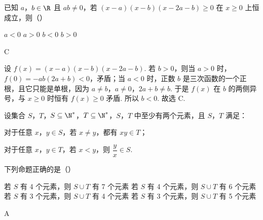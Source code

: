 \begin{problem}
已知 \(a\)，\(b\in\R\) 且 \(ab\neq0\)，若 \((x-a)(x-b)(x-2a-b)\ge0\) 在 \(x\ge0\) 上恒成立，则（\quad）

\choices
    {\(a<0\)}
    {\(a>0\)}
    {\(b<0\)}
    {\(b>0\)}
\end{problem}

\begin{answer}
C
\end{answer}

\begin{solution}
设 \(f(x)=(x-a)(x-b)(x-2a-b)\).
若 \(b>0\)，则当 \(a>0\) 时，\(f(0)=-ab(2a+b)<0\)，矛盾；当 \(a<0\) 时，正数 \(b\) 是三次函数的一个正根，且它只能是单根，因为 \(a\ne b\)，\(a\ne0\)，\(2a+b\ne b\). 于是 \(f(x)\) 在 \(b\) 的两侧异号，与 \(x\ge0\) 时恒有 \(f(x)\ge0\) 矛盾.
所以 \(b<0\). 故选 C.
\end{solution}

\begin{problem}
设集合 \(S\)，\(T\)，\(S\subseteq\N^*\)，\(T\subseteq\N^*\)，\(S\)，\(T\) 中至少有两个元素，且 \(S\)，\(T\) 满足：

\begin{circlelist}
\item 对于任意 \(x\)，\(y\in S\)，若 \(x\ne y\)，都有 \(xy\in T\)；

\item 对于任意 \(x\)，\(y\in T\)，若 \(x<y\)，则 \(\dfrac{y}{x}\in S\).
\end{circlelist}

下列命题正确的是（\quad）

\choices
    {若 \(S\) 有 4 个元素，则 \(S\cup T\) 有 7 个元素}
    {若 \(S\) 有 4 个元素，则 \(S\cup T\) 有 6 个元素}
    {若 \(S\) 有 3 个元素，则 \(S\cup T\) 有 4 个元素}
    {若 \(S\) 有 3 个元素，则 \(S\cup T\) 有 5 个元素}
\end{problem}

\begin{answer}
A
\end{answer}

